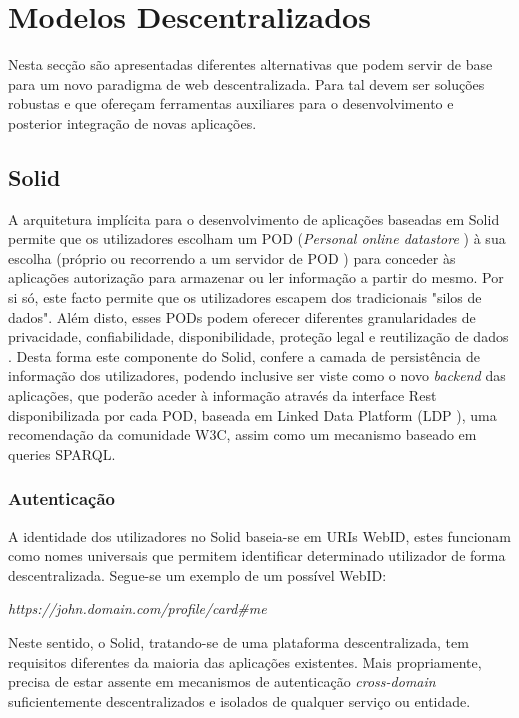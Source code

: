 \section{Modelos Descentralizados}
Nesta secção são apresentadas diferentes alternativas que podem servir de base para um novo paradigma de web descentralizada. Para tal devem ser soluções robustas e que ofereçam ferramentas auxiliares para o desenvolvimento e posterior integração de novas aplicações.

\subsection{Solid}
A arquitetura implícita para o desenvolvimento de aplicações baseadas em Solid permite que os utilizadores escolham um POD (\emph{Personal online datastore} \label{sym:POD})  à sua escolha (próprio ou recorrendo a um servidor de POD \label{sym:POD}) para conceder às aplicações autorização para armazenar ou ler informação a partir do mesmo. Por si só, este facto permite que os utilizadores escapem dos tradicionais "silos de dados". Além disto, esses PODs \label{sym:POD} podem oferecer diferentes granularidades de privacidade, confiabilidade, disponibilidade, proteção legal e reutilização de dados \cite{solid_official}. Desta forma este componente do Solid, confere a camada de persistência de informação dos utilizadores, podendo inclusive ser viste como o novo \emph{backend} das aplicações, que poderão aceder à informação através da interface Rest \cite{rest_foundations} disponibilizada por cada POD, baseada em Linked Data Platform (LDP \label{sym:LDP}), uma recomendação da comunidade W3C, assim como um mecanismo baseado em queries SPARQL.\cite{solid_spec}

\subsubsection{Autenticação}
A identidade dos utilizadores no Solid baseia-se em URIs WebID, estes funcionam como nomes universais que permitem identificar determinado utilizador de forma descentralizada. Segue-se um exemplo de um possível WebID:

\emph{https://john.domain.com/profile/card\#me}

Neste sentido, o Solid, tratando-se de uma plataforma descentralizada, tem requisitos diferentes da maioria das aplicações existentes. Mais propriamente, precisa de estar assente em mecanismos de autenticação \emph{cross-domain} suficientemente descentralizados e isolados de qualquer serviço ou entidade.\cite{solid_spec}

